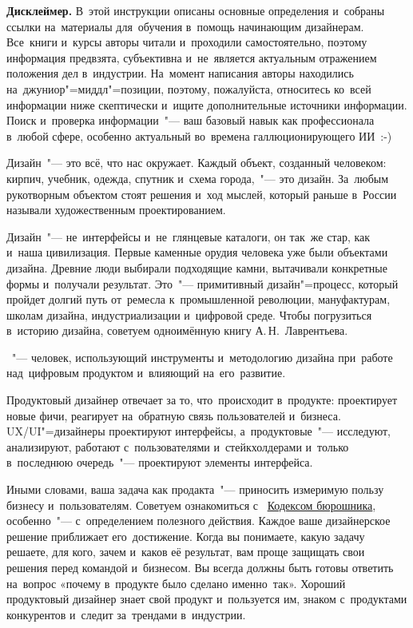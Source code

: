 

\textbf{Дисклеймер.} В~этой инструкции описаны основные определения
и~собраны ссылки на~материалы для~обучения в~помощь начинающим
дизайнерам. Все~книги и~курсы авторы читали и~проходили
самостоятельно, поэтому информация предвзята, субъективна
и~не~является актуальным отражением положения дел в~индустрии.
На~момент написания авторы находились на~джуниор"=миддл"=позиции,
поэтому, пожалуйста, относитесь ко~всей информации ниже скептически
и~ищите дополнительные источники информации. Поиск и~проверка
информации~"--- ваш базовый навык как профессионала в~любой сфере,
особенно актуальный во~времена галлюционирующего ИИ~:-)

Дизайн~"--- это всё, что нас окружает. Каждый объект, созданный
человеком: кирпич, учебник, одежда, спутник и~схема города,~"--- это
дизайн. За~любым рукотворным объектом стоят решения и~ход мыслей,
который раньше в~России называли художественным проектированием. 

Дизайн~"--- не~интерфейсы и~не~глянцевые каталоги, он так~же стар,
как и~наша цивилизация. Первые каменные орудия человека уже были
объектами дизайна. Древние люди выбирали подходящие камни,
вытачивали конкретные формы и~получали результат. Это~"---
примитивный дизайн"=процесс, который пройдет долгий путь от~ремесла
к~промышленной революции, мануфактурам, школам дизайна,
индустриализации и~цифровой среде. Чтобы погрузиться в~историю
дизайна, советуем одноимённую книгу А.\,Н.~Лаврентьева.

\begin{definition}
	~"--- человек, использующий инструменты
	и~методологию дизайна при~работе над~цифровым продуктом и~влияющий
	на~его~развитие. 
\end{definition}


Продуктовый дизайнер отвечает за то, что~происходит в~продукте:
проектирует новые фичи, реагирует на~обратную связь пользователей
и~бизнеса. UX/UI"=дизайнеры проектируют интерфейсы,
а~продуктовые~"--- исследуют, анализируют, работают с~пользователями
и~стейкхолдерами и~только в~последнюю очередь~"--- проектируют
элементы интерфейса. 

Иными словами, ваша задача как продакта~"--- приносить измеримую
пользу бизнесу и~пользователям. Советуем ознакомиться с~%
\href{https://bureau.ru/soviet/20140623/}{Кодексом бюрошника},
особенно~"--- с~определением полезного действия. Каждое ваше
дизайнерское решение приближает его~достижение. Когда вы понимаете,
какую задачу решаете, для кого, зачем и~каков её результат, вам
проще защищать свои решения перед командой и~бизнесом. Вы всегда
должны быть готовы ответить на~вопрос «почему в~продукте было
сделано именно~так». Хороший продуктовый дизайнер знает свой продукт
и~пользуется им, знаком с~продуктами конкурентов и~следит
за~трендами в~индустрии.


